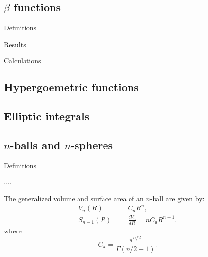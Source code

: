 \subsection{$\beta$ functions}

Definitions

Results

Calculations

\subsection{Hypergoemetric functions}


\subsection{Elliptic integrals}



\subsection{$n$-balls and $n$-spheres}

Definitions

....


The generalized volume and surface area of an $n$-ball are given by:
\begin{eqnarray}
V_n(R) & = & C_n R^n,
 \label{eq:gen_vol} \\
S_{n-1}(R) & = & \frac{dV_n}{dR} = n C_n R^{n-1}.
 \label{eq:gen_surf}
\end{eqnarray}
where
\begin{equation}
 \label{eq:cn}
  C_n = \frac{ \pi^{n/2} }{\Gamma(n/2 + 1)}.
\end{equation}


